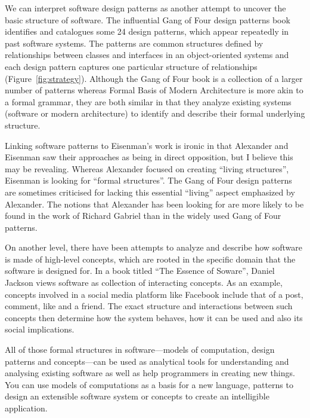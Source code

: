 We can interpret software design patterns as another attempt to uncover the basic
structure of software. The influential Gang of Four design patterns book identifies
and catalogues some 24 design patterns, which appear repeatedly in past software systems. The
patterns are common structures defined by relationships between classes and interfaces in an
object-oriented systems and each design pattern captures one particular structure
of relationships (Figure~\ref{fig:strategy}). Although the Gang of Four book is a collection of
a larger number of patterns whereas Formal Basis of Modern Architecture is more akin to a formal
grammar, they are both similar in that they analyze existing systems (software or modern
architecture) to identify and describe their formal underlying structure.

Linking software patterns to Eisenman's work is ironic in that Alexander and Eisenman saw
their approaches as being in direct opposition, but I believe this may be
revealing. Whereas Alexander focused on creating ``living structures'', Eisenman is looking
for ``formal structures''. The Gang of Four design patterns are sometimes criticised for lacking
this essential ``living'' aspect emphasized by Alexander. The notions that Alexander has been
looking for are more likely to be found in the work of Richard Gabriel
than in the widely used Gang of Four patterns.

On another level, there have been attempts to analyze and describe how software is made of
high-level concepts, which are rooted in the specific domain that the software is designed
for. In a book titled ``The Essence of Soware'', Daniel Jackson views software
as collection of interacting concepts. As an example, concepts involved in a social media
platform like Facebook include that of a post, comment, like and a friend. The exact structure
and interactions between such concepts then determine how the system behaves, how it can be
used and also its social implications.

All of those formal structures in software---models of computation, design patterns and
concepts---can be used as analytical tools for understanding and analysing existing software
as well as help programmers in creating new things. You can use models of computations as a
basis for a new language, patterns to design an extensible software system or concepts to
create an intelligible application.

